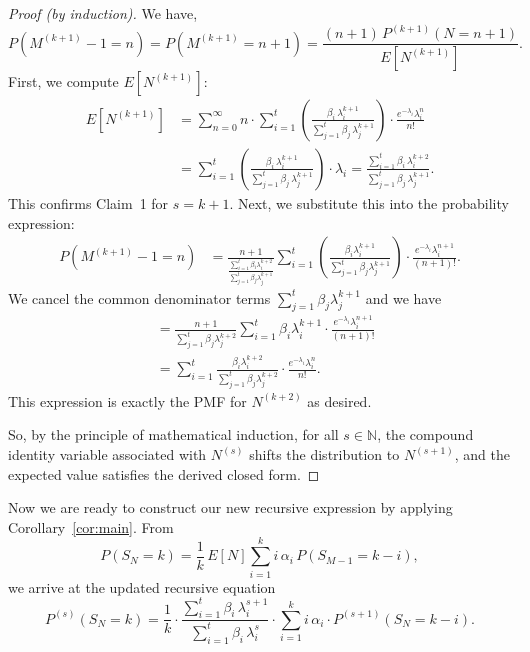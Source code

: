 \documentclass[11pt]{amsart}
\theoremstyle{definition}
\theoremstyle{plain}
\begin{document}
\begin{proof}[Proof (by induction)]
We have,
\[
    P(M^{(k+1)} - 1 = n)
    = P(M^{(k+1)} = n + 1)
    = \frac{(n+1)\,P^{(k+1)}(N = n+1)}{E[N^{(k+1)}]}.
\]
First, we compute $E[N^{(k+1)}]$:
\begin{align*}
E[N^{(k+1)}]
    &= \sum_{n=0}^{\infty} n \cdot
       \sum_{i=1}^{t}
       \left(\frac{\beta_i\,\lambda_i^{k+1}}{\sum_{j=1}^{t}\beta_j\,\lambda_j^{k+1}}\right)
       \cdot \frac{e^{-\lambda_i}\lambda_i^n}{n!} \\
    &= \sum_{i=1}^{t}
       \left(\frac{\beta_i\,\lambda_i^{k+1}}{\sum_{j=1}^{t}\beta_j\,\lambda_j^{k+1}}\right)
       \cdot \lambda_i
     = \frac{\sum_{i=1}^{t}\beta_i\,\lambda_i^{k+2}}
            {\sum_{j=1}^{t}\beta_j\,\lambda_j^{k+1}}.
\end{align*}
This confirms Claim~1 for $s = k + 1$.  Next, we substitute this into the probability
expression:
\begin{align*}
P(M^{(k+1)} - 1 = n)
    &= \frac{n+1}
      {\displaystyle\frac{\sum_{i=1}^{t}\beta_i\lambda_i^{k+2}}
                         {\sum_{j=1}^{t}\beta_j\lambda_j^{k+1}}}
       \sum_{i=1}^{t}
       \left(\frac{\beta_i\lambda_i^{k+1}}{\sum_{j=1}^{t}\beta_j\lambda_j^{k+1}}\right)
       \cdot \frac{e^{-\lambda_i}\lambda_i^{n+1}}{(n+1)!}.
\end{align*}
We cancel the common denominator terms $\sum_{j=1}^{t}\beta_j\lambda_j^{k+1}$ and we have
\begin{align*}
    &= \frac{n+1}{\sum_{j=1}^{t}\beta_j\lambda_j^{k+2}}
       \sum_{i=1}^{t}\beta_i\lambda_i^{k+1}
       \cdot \frac{e^{-\lambda_i}\lambda_i^{n+1}}{(n+1)!} \\
    &= \sum_{i=1}^{t}
       \frac{\beta_i\lambda_i^{k+2}}{\sum_{j=1}^{t}\beta_j\lambda_j^{k+2}}
       \cdot \frac{e^{-\lambda_i}\lambda_i^n}{n!}.
\end{align*}
This expression is exactly the PMF for $N^{(k+2)}$ as desired.

So, by the principle of mathematical induction, for all $s \in \mathbb{N}$, the compound
identity variable associated with $N^{(s)}$ shifts the distribution to $N^{(s+1)}$, and
the expected value satisfies the derived closed form.
\end{proof}

Now we are ready to construct our new recursive expression by applying
Corollary~\ref{cor:main}.  From
\[
    P(S_N = k) = \frac{1}{k}\,E[N]\sum_{i=1}^{k} i\,\alpha_i\,P(S_{M-1} = k - i),
\]
we arrive at the updated recursive equation
\[
    P^{(s)}(S_N = k)
    = \frac{1}{k}
      \cdot \frac{\sum_{i=1}^{t}\beta_i\,\lambda_i^{s+1}}
                 {\sum_{i=1}^{t}\beta_i\,\lambda_i^s}
      \cdot \sum_{i=1}^{k} i\,\alpha_i \cdot P^{(s+1)}(S_N = k - i).
\]
\end{document}
